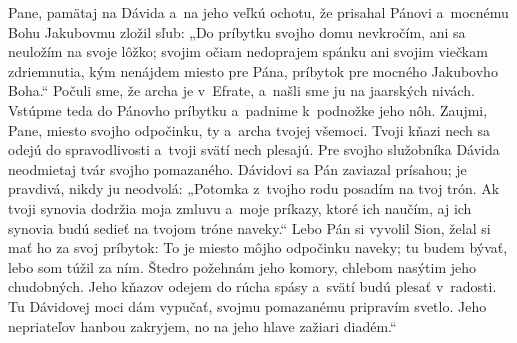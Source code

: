 Pane, pamätaj na Dávida
a~na jeho veľkú ochotu,
\versseparator
že prisahal Pánovi
a~mocnému Bohu Jakubovmu zložil sľub:
\versseparator
„Do príbytku svojho domu nevkročím,
ani sa neuložím na svoje lôžko;
\versseparator
svojim očiam nedoprajem spánku
ani svojim viečkam zdriemnutia,
\versseparator
kým nenájdem miesto pre Pána,
príbytok pre mocného Jakubovho Boha.“
\versseparator
Počuli sme, že archa je v~Efrate,
a~našli sme ju na jaarských nivách.
\versseparator
Vstúpme teda do Pánovho príbytku
a~padnime k~podnožke jeho nôh.
\versseparator
Zaujmi, Pane, miesto svojho odpočinku,
ty a~archa tvojej všemoci.
\versseparator
Tvoji kňazi nech sa odejú do spravodlivosti
a~tvoji svätí nech plesajú.
\versseparator
Pre svojho služobníka Dávida
neodmietaj tvár svojho pomazaného.
\versseparator
Dávidovi sa Pán zaviazal prísahou;
je pravdivá, nikdy ju neodvolá:
„Potomka z~tvojho rodu
posadím na tvoj trón.
\versseparator
Ak tvoji synovia dodržia moja zmluvu
a~moje príkazy, ktoré ich naučím,
\versseparator
aj ich synovia budú sedieť
na tvojom tróne naveky.“
\versseparator
Lebo Pán si vyvolil Sion,
želal si mať ho za svoj príbytok:
\versseparator
To je miesto môjho odpočinku naveky;
tu budem bývať, lebo som túžil za ním.
\versseparator
Štedro požehnám jeho komory,
chlebom nasýtim jeho chudobných.
\versseparator
Jeho kňazov odejem do rúcha spásy
a~svätí budú plesať v~radosti.
\versseparator
Tu Dávidovej moci dám vypučať,
svojmu pomazanému pripravím svetlo.
\versseparator
Jeho nepriateľov hanbou zakryjem,
no na jeho hlave zažiari diadém.“